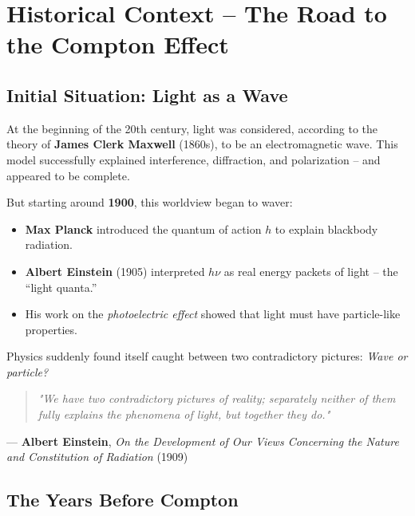 	\section{Historical Context – The Road to the Compton Effect}

\subsection{Initial Situation: Light as a Wave}

At the beginning of the 20th century, light was considered, according to the theory of \textbf{James Clerk Maxwell} (1860s), to be an electromagnetic wave. 
This model successfully explained interference, diffraction, and polarization – and appeared to be complete.

But starting around \textbf{1900}, this worldview began to waver:

\begin{itemize}
	\item \textbf{Max Planck} introduced the quantum of action \( h \) to explain blackbody radiation.
	\item \textbf{Albert Einstein} (1905) interpreted \( h\nu \) as real energy packets of light – the “light quanta.”
	\item His work on the \emph{photoelectric effect} showed that light must have particle-like properties.
\end{itemize}

Physics suddenly found itself caught between two contradictory pictures:  
\emph{Wave or particle?}

\vspace{1em}
\begin{HistoryBox}
	\begin{quote}
		\emph{"We have two contradictory pictures of reality; separately neither of them fully explains the phenomena of light, but together they do."}
	\end{quote}
	
	\hfill --- \textbf{Albert Einstein}, \emph{On the Development of Our Views Concerning the Nature and Constitution of Radiation} (1909)
	\label{box:Einstein1909}
\end{HistoryBox}

\vspace{1em}
\subsection{The Years Before Compton}


